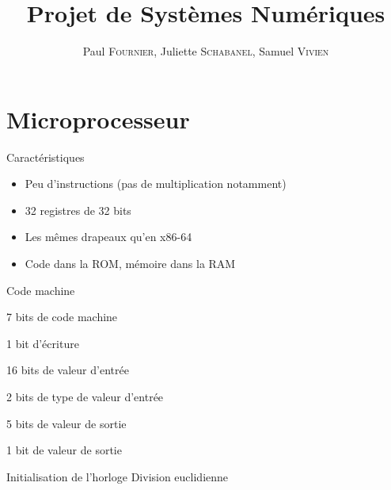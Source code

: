 \documentclass[intlimits, 10pt]{beamer}
\title[\textsc{Ernest'O'Clock}]{Projet de Systèmes Numériques}
\date{}
\author[\textsc{Fournier}, \textsc{Schabanel}, \textsc{Vivien}]{Paul \textsc{Fournier}, Juliette \textsc{Schabanel}, Samuel \textsc{Vivien}}
\begin{document}
	
	\maketitle	
	
	\begin{frame}
		\tableofcontents
	\end{frame}
	
	\section{Microprocesseur}
	
	\begin{frame}{Caractéristiques}
		\begin{itemize}
			\item Peu d'instructions (pas de multiplication notamment)
			\item 32 registres de 32 bits
			\item Les mêmes drapeaux qu'en x86-64
			\item Code dans la ROM, mémoire dans la RAM
		\end{itemize}
	\end{frame}

	\begin{frame}{Code machine}
		\item 7 bits de code machine
		\item 1 bit d'écriture
		\item 16 bits de valeur d'entrée
		\item 2 bits de type de valeur d'entrée
		\item 5 bits de valeur de sortie
		\item 1 bit de valeur de sortie
	\end{frame}

	\begin{frame}{Initialisation de l'horloge}
		Division euclidienne
	\end{frame}
\end{document}
